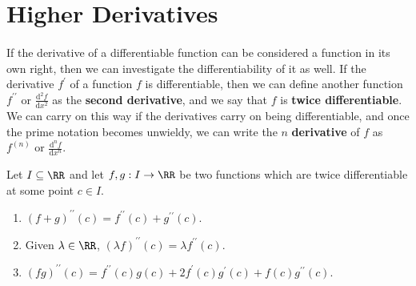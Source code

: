 \documentclass[../real_analysis.tex]{subfiles}
\begin{document}
    \section{Higher Derivatives}
        \paragraph{}
        If the derivative of a differentiable function can be considered a function in its own right, then we can investigate the differentiability of it as well. If the derivative $f^\prime$ of a function $f$ is differentiable, then we can define another function $f^{\prime\prime}$ or $\frac{\mathrm{d}^2f}{\mathrm{d}x^2}$ as the \textbf{second derivative}, and we say that $f$ is \textbf{twice differentiable}. We can carry on this way if the derivatives carry on being differentiable, and once the prime notation becomes unwieldy, we can write the $n$ \textbf{derivative} of $f$ as $f^{(n)}$ or $\frac{\mathrm{d}^nf}{\mathrm{d}x^n}$.
        \begin{theorem}\label{2-diff-func-props}
            Let $I\subseteq\RR$ and let $f,g:I\to\RR$ be two functions which are twice differentiable at some point $c\in I$.
            \begin{enumerate}[label={\upshape(\roman*)}]
                \item $(f+g)^{\prime\prime}(c)=f^{\prime\prime}(c)+g^{\prime\prime}(c)$.
                \item Given $\lambda\in\RR$, $(\lambda f)^{\prime\prime}(c)=\lambda f^{\prime\prime}(c)$.
                \item $(fg)^{\prime\prime}(c)=f^{\prime\prime}(c)g(c)+2f^\prime(c)g^\prime(c)+f(c)g^{\prime\prime}(c)$.
            \end{enumerate}
        \end{theorem}
\end{document}
